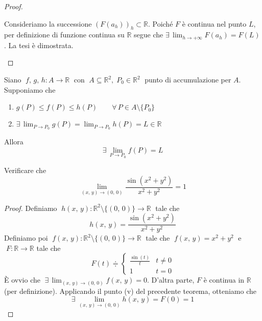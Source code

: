 \begin{proof}
\begin{enumerate}[labelindent=\parindent,leftmargin=*,label=\textnormal{(\roman*)},start=1]
Consideriamo la successione $(F(a_h))_h \subset \mathbb{R}$. Poiché $F$ è continua nel punto $L$, per definizione di funzione continua su $\mathbb{R}$ segue che $\displaystyle \exists \, \lim_{h \rightarrow +\infty} F(a_h) = F(L)$. La tesi è dimostrata.
\end{enumerate}
\end{proof}

\begin{cor}
Siano $\; f,\, g,\, h : A \longrightarrow \mathbb{R} \;$ con $\; A \subseteq \mathbb{R}^2, \; P_0 \in \mathbb{R}^2 \;$ punto di accumulazione per $A$. Supponiamo che
\begin{enumerate}[labelindent=\parindent,leftmargin=*,label=\textnormal{(\roman*)},start=1]
\item $g(P) \leq f(P) \leq h(P) \qquad \forall \, P \in A \setminus \lbrace P_0 \rbrace$
\item $\exists \, \displaystyle \lim_{P \rightarrow P_0} g(P) = \lim_{P \rightarrow P_0} h(P) = L \in \mathbb{R}$
\end{enumerate}
Allora
$$\exists \, \lim_{P \rightarrow P_0} f(P) = L$$
\end{cor}

\begin{example}[i]
Verificare che
$$\lim_{(x,\, y) \rightarrow (0,\, 0)} \frac{\sin(x^2+y^2)}{x^2+y^2} = 1$$
\end{example}
\begin{proof}
Definiamo $\; h(x,\, y) : \mathbb{R}^2 \setminus \lbrace (0,\, 0) \rbrace \longrightarrow \mathbb{R} \;$ tale che
$$h(x,\, y) = \frac{\sin(x^2+y^2)}{x^2+y^2}$$
Definiamo poi $\; f(x,\, y) : \mathbb{R}^2 \setminus \lbrace (0,\, 0) \rbrace \longrightarrow \mathbb{R} \;$ tale che $\; f(x,\, y) = x^2 + y^2 \;$ e $\; F : \mathbb{R} \longrightarrow \mathbb{R}$ tale che
$$
F(t) \doteqdot
\begin{cases}
\frac{\sin (t)}{t} & t \neq 0 \\
1 & t = 0
\end{cases}
$$
\`E ovvio che $\; \displaystyle \exists \, \lim_{(x,\, y) \rightarrow (0,\, 0)} f(x,\, y) = 0$. D'altra parte, $F$ è continua in $\mathbb{R}$ (per definizione). Applicando il punto (v) del precedente teorema, otteniamo che
$$\exists \, \lim_{(x,\, y) \rightarrow (0,\, 0)} h(x,\, y) = F(0) = 1$$
\end{proof}

